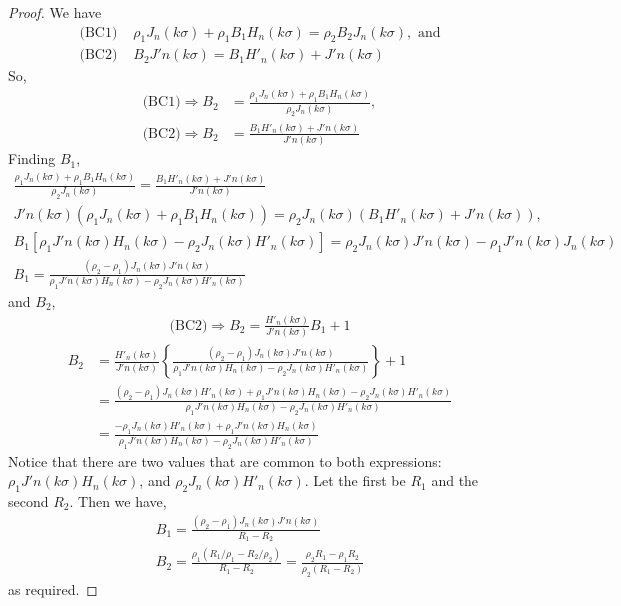 \begin{proof}
  We have
  \begin{align*}
  \text{(BC1)  }& \rho_1 J_n(k\sigma) + \rho_1 B_1 H_n(k\sigma) = \rho_2 B_2 J_n (k\sigma), \text{ and}\\
  \text{(BC2)  }& B_2 J'n(k\sigma) = B_1 H'_n(k\sigma) + J'n(k\sigma)
  \end{align*}
  So,
  \begin{align*}
    \text{(BC1)} \Rightarrow B_2 &= \frac{\rho_1 J_n(k\sigma) + \rho_1 B_1 H_n(k\sigma)}{\rho_2 J_n (k\sigma)}, \\
    \text{(BC2)} \Rightarrow B_2 &= \frac{B_1 H'_n(k\sigma) + J'n(k\sigma)}{J'n(k\sigma)}
  \end{align*}
  Finding $B_1$,
  \begin{gather*}
    \frac{\rho_1 J_n(k\sigma) + \rho_1 B_1 H_n(k\sigma)}{\rho_2 J_n (k\sigma)} = \frac{B_1 H'_n(k\sigma) + J'n(k\sigma)}{J'n(k\sigma)} \\
    J'n(k\sigma)(\rho_1 J_n(k\sigma) + \rho_1 B_1 H_n(k\sigma)) = \rho_2 J_n (k\sigma)(B_1 H'_n(k\sigma) + J'n(k\sigma)), \\
    B_1 \left[ \rho_1 J'n(k\sigma) H_n(k\sigma) -  \rho_2 J_n (k\sigma) H'_n(k\sigma) \right] = \rho_2 J_n (k\sigma)J'n(k\sigma) - \rho_1 J'n(k\sigma) J_n(k\sigma) \\
    B_1 = \frac{(\rho_2-\rho_1)J_n (k\sigma)J'n(k\sigma)}{ \rho_1 J'n(k\sigma) H_n(k\sigma) -  \rho_2 J_n (k\sigma) H'_n(k\sigma)}
  \end{gather*}
  and $B_2$,
  \begin{gather*}
    \text{(BC2)} \Rightarrow B_2 = \frac{H'_n(k\sigma)}{J'n(k\sigma)}B_1 + 1
  \end{gather*}
  \begin{align*}
    B_2 &= \frac{H'_n(k\sigma)}{J'n(k\sigma)} \left\{ \frac{(\rho_2-\rho_1)J_n (k\sigma)J'n(k\sigma)}{ \rho_1 J'n(k\sigma) H_n(k\sigma) -  \rho_2 J_n (k\sigma) H'_n(k\sigma)} \right\} + 1 \\
    &= \frac{(\rho_2-\rho_1)J_n (k\sigma)H'_n(k\sigma) + \rho_1 J'n(k\sigma) H_n(k\sigma) -  \rho_2 J_n (k\sigma) H'_n(k\sigma)
    }{
    \rho_1 J'n(k\sigma) H_n(k\sigma) -  \rho_2 J_n (k\sigma) H'_n(k\sigma)} \\
    &= \frac{-\rho_1 J_n (k\sigma)H'_n(k\sigma) + \rho_1 J'n(k\sigma) H_n(k\sigma)}{\rho_1 J'n(k\sigma) H_n(k\sigma) -  \rho_2 J_n (k\sigma) H'_n(k\sigma)}
  \end{align*}
  Notice that there are two values that are common to both expressions: $\rho_1 J'n(k\sigma) H_n(k\sigma)$, and $\rho_2 J_n (k\sigma) H'_n(k\sigma)$. Let the first be $R_1$ and the second $R_2$. Then we have,
  \begin{gather*}
    B_1 = \frac{(\rho_2-\rho_1)J_n (k\sigma)J'n(k\sigma)}{R_1 - R_2} \\
    B_2 = \frac{\rho_1(R_1/\rho_1- R_2/\rho_2)}{R_1 - R_2} = \frac{\rho_2R_1- \rho_1 R_2}{\rho_2(R_1 - R_2)}
  \end{gather*}
  as required.
\end{proof}

